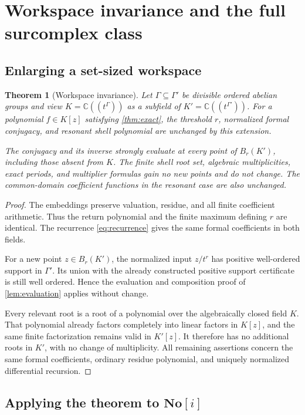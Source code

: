 \documentclass[11pt,letterpaper]{article}
\numberwithin{equation}{section}
\theoremstyle{plain}
\newtheorem{theorem}{Theorem}[section]
\theoremstyle{definition}
\theoremstyle{remark}
\newcommand{\C}{\mathbb C}
\newcommand{\No}{\mathbf{No}}
\begin{document}
\section{Workspace invariance and the full surcomplex class}\label{sec:workspace}

\subsection{Enlarging a set-sized workspace}

\begin{theorem}[Workspace invariance]\label{thm:workspace}
Let $\Gamma\subseteq\Gamma'$ be divisible ordered abelian groups and view
$K=\C((t^\Gamma))$ as a subfield of
$K'=\C((t^{\Gamma'}))$. For a polynomial $f\in K[z]$ satisfying
\cref{thm:exact}, the threshold $r$, normalized formal conjugacy, and
resonant shell polynomial are unchanged by this extension.

The conjugacy and its inverse strongly evaluate at every point of
$B_r(K')$, including those absent from $K$. The finite shell root set,
algebraic multiplicities, exact periods, and multiplier formulas gain no new
points and do not change. The common-domain coefficient functions in the
resonant case are also unchanged.
\end{theorem}

\begin{proof}
The embeddings preserve valuation, residue, and all finite coefficient
arithmetic. Thus the return polynomial and the finite maximum defining $r$
are identical. The recurrence \eqref{eq:recurrence} gives the same formal
coefficients in both fields.

For a new point $z\in B_r(K')$, the normalized input $z/t^r$ has positive
well-ordered support in $\Gamma'$. Its union with the already constructed
positive support certificate is still well ordered. Hence the evaluation
and composition proof of \cref{lem:evaluation} applies without change.

Every relevant root is a root of a polynomial over the algebraically closed
field $K$. That polynomial already factors completely into linear factors
in $K[z]$, and the same finite factorization remains valid in $K'[z]$.
It therefore has no additional roots in $K'$, with no change of
multiplicity. All remaining assertions concern the same formal coefficients,
ordinary residue polynomial, and uniquely normalized differential recursion.
\end{proof}

\subsection{Applying the theorem to \texorpdfstring{$\No[i]$}{No[i]}}
\end{document}
